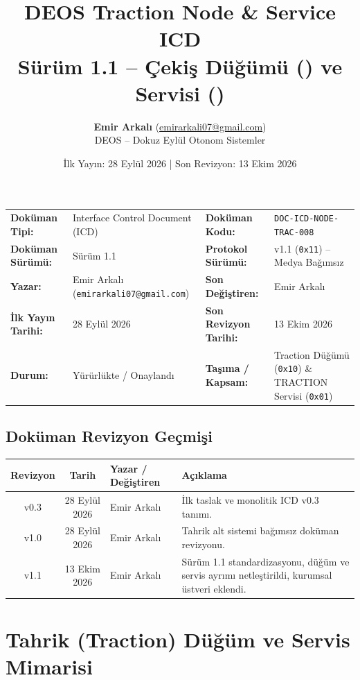 \documentclass[a4paper,10pt]{article}
\title{\textbf{DEOS Traction Node \& Service ICD}\\
\large Sürüm 1.1 -- Çekiş Düğümü (\hex{10}) ve Servisi (\hex{01})}
\author{\textbf{Emir Arkalı} (\href{mailto:emirarkali07@gmail.com}{emirarkali07@gmail.com})\\DEOS -- Dokuz Eylül Otonom Sistemler}
\date{İlk Yayın: 28 Eylül 2026 \quad | \quad Son Revizyon: 13 Ekim 2026}
\newcommand{\hex}[1]{\texttt{0x#1}}
\newcommand{\code}[1]{\texttt{#1}}
\begin{document}
\maketitle

\begin{center}
\small
\begin{tabularx}{\textwidth}{ll lX}
\toprule
\textbf{Doküman Tipi:} & Interface Control Document (ICD) & \textbf{Doküman Kodu:} & \code{DOC-ICD-NODE-TRAC-008} \\
\textbf{Doküman Sürümü:} & Sürüm 1.1 & \textbf{Protokol Sürümü:} & v1.1 (\hex{11}) -- Medya Bağımsız \\
\textbf{Yazar:} & Emir Arkalı (\texttt{emirarkali07@gmail.com}) & \textbf{Son Değiştiren:} & Emir Arkalı \\
\textbf{İlk Yayın Tarihi:} & 28 Eylül 2026 & \textbf{Son Revizyon Tarihi:} & 13 Ekim 2026 \\
\textbf{Durum:} & Yürürlükte / Onaylandı & \textbf{Taşıma / Kapsam:} & Traction Düğümü (\hex{10}) \& TRACTION Servisi (\hex{01}) \\
\bottomrule
\end{tabularx}
\end{center}

\subsection*{Doküman Revizyon Geçmişi}
\begin{center}
\small
\begin{tabularx}{\textwidth}{c c l X}
\toprule
\textbf{Revizyon} & \textbf{Tarih} & \textbf{Yazar / Değiştiren} & \textbf{Açıklama} \\
\midrule
v0.3 & 28 Eylül 2026 & Emir Arkalı & İlk taslak ve monolitik ICD v0.3 tanımı. \\
v1.0 & 28 Eylül 2026 & Emir Arkalı & Tahrik alt sistemi bağımsız doküman revizyonu. \\
v1.1 & 13 Ekim 2026 & Emir Arkalı & Sürüm 1.1 standardizasyonu, düğüm ve servis ayrımı netleştirildi, kurumsal üstveri eklendi. \\
\bottomrule
\end{tabularx}
\end{center}
\vspace{0.8em}

\section{Tahrik (Traction) Düğüm ve Servis Mimarisi}
\end{document}
